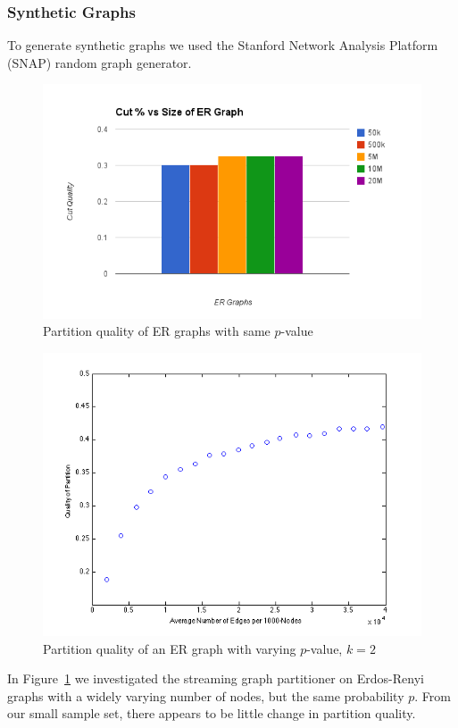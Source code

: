 \subsubsection{Synthetic Graphs}
To generate synthetic graphs we used the Stanford Network Analysis Platform (SNAP) random graph generator. 

\begin{figure}[h!]
\centering
  \includegraphics[width=0.8\columnwidth]{figures/lambda_ER.png}
  \caption{Partition quality of ER graphs with same $p$-value}
  \label{fig:lambdaer}
\end{figure}

\begin{figure}[h!]
\centering
  \includegraphics[width=0.8\columnwidth]{figures/varied_er_p.png}
  \caption{Partition quality of an ER graph with varying $p$-value, $k=2$}
  \label{fig:lambdap}
\end{figure}



In Figure~\ref{fig:lambdaer} we investigated the streaming graph partitioner on Erdos-Renyi graphs with a widely varying number of nodes, but the same probability $p$. From our small sample set, there appears to be little change in partition quality. 

